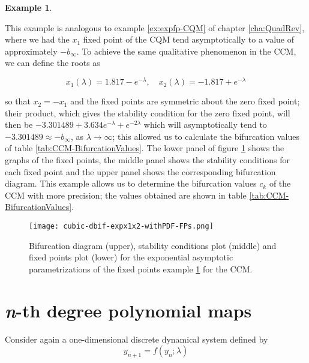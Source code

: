 \documentclass[10pt,twoside,titlepage]{book}
\numberwithin{equation}{chapter}
\numberwithin{figure}{chapter}
\numberwithin{table}{chapter}
\theoremstyle{plain}%
\theoremstyle{definition}
\newtheorem{example}{Example}[chapter]
\theoremstyle{remark}
\begin{document}
\begin{example}
	\label{ex:CCM-exponential}
	
	This example is analogous to example \ref{ex:expfp-CQM} of chapter \ref{cha:QuadRev}, where we had the $x_1$ fixed point of the CQM tend asymptotically to a value of approximately $-b_{\infty}$. To achieve the same qualitative phenomenon in the CCM, we can define the roots as
	
	\begin{equation}
		x_1(\lambda)=1.817-e^{-\lambda},\quad x_2(\lambda)=-1.817+e^{-\lambda}
	\end{equation}
	
	so that $x_2=-x_1$ and the fixed points are symmetric about the zero fixed point; their product, which gives the stability condition for the zero fixed point, will then be $-3.301489+3.634e^{-\lambda}+e^{-2\lambda}$ which will asymptotically tend to $-3.301489\approx -b_{\infty}$, as $\lambda\rightarrow\infty$; this allowed us to calculate the bifurcation values of table \ref{tab:CCM-BifurcationValues}. The lower panel of figure \ref{fig:CCM-exponential} shows the graphs of the fixed points, the middle panel shows the stability conditions for each fixed point and the upper panel shows the corresponding bifurcation diagram. This example allows us to determine the bifurcation values $c_k$ of the CCM with more precision; the values obtained are shown in table \ref{tab:CCM-BifurcationValues}.
	
	\begin{figure}
		\centering
		\texttt{[image: cubic-dbif-expx1x2-withPDF-FPs.png]}
		\caption{Bifurcation diagram (upper), stability conditions plot (middle) and fixed points plot (lower) for the exponential asymptotic parametrizations of the fixed points example \ref{ex:CCM-exponential} for the CCM.}
		\label{fig:CCM-exponential}
	\end{figure}
	
\end{example}

\chapter{\textit{n}-th degree polynomial maps}
\label{cha:Generalization}

Consider again a one-dimensional discrete dynamical system defined by
\begin{equation}
	y_{n+1}=f(y_n;\lambda)
\end{equation}
\end{document}
